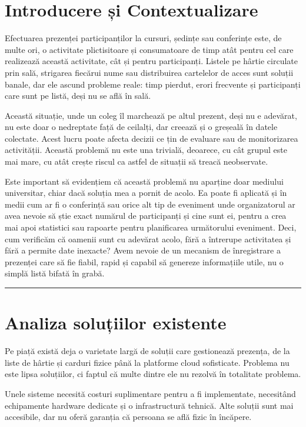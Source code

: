 \documentclass[a4paper,12pt,oneside]{report}
\begin{document}
\section{Introducere și Contextualizare}
Efectuarea prezenței participanților la cursuri, ședințe sau conferințe este, de multe ori, o activitate plictisitoare și consumatoare de timp atât pentru cel care realizează această activitate, cât și pentru participanți. Listele pe hârtie circulate prin sală, strigarea fiecărui nume sau distribuirea cartelelor de acces sunt soluții banale, dar ele ascund probleme reale: timp pierdut, erori frecvente și participanți care sunt pe listă, deși nu se află în sală.

Această situație, unde un coleg îl marchează pe altul prezent, deși nu e adevărat, nu este doar o nedreptate față de ceilalți, dar creează și o greșeală în datele colectate. Acest lucru poate afecta decizii ce țin de evaluare sau de monitorizarea activității. Această problemă nu este una trivială, deoarece, cu cât grupul este mai mare, cu atât crește riscul ca astfel de situații să treacă neobservate.

Este important să evidențiem că această problemă nu aparține doar mediului universitar, chiar dacă soluția mea a pornit de acolo. Ea poate fi aplicată și în medii cum ar fi o conferință sau orice alt tip de eveniment unde organizatorul ar avea nevoie să știe exact numărul de participanți și cine sunt ei, pentru a crea mai apoi statistici sau rapoarte pentru planificarea următorului eveniment. Deci, cum verificăm că oamenii sunt cu adevărat acolo, fără a întrerupe activitatea și fără a permite date inexacte? Avem nevoie de un mecanism de înregistrare a prezenței care să fie fiabil, rapid și capabil să genereze informațiile utile, nu o simplă listă bifată în grabă.

\noindent\rule{\textwidth}{0.4pt}

\section{Analiza soluțiilor existente}

Pe piață există deja o varietate largă de soluții care gestionează prezența, de la liste de hârtie și carduri fizice până la platforme cloud sofisticate.
Problema nu este lipsa soluțiilor, ci faptul că multe dintre ele nu rezolvă în totalitate problema.

Unele sisteme necesită costuri suplimentare pentru a fi implementate, necesitând echipamente hardware dedicate și o infrastructură tehnică.
Alte soluții sunt mai accesibile, dar nu oferă garanția că persoana se află fizic în încăpere.
\end{document}
